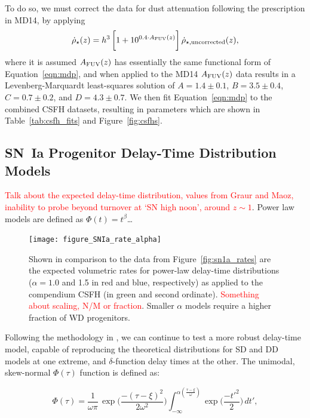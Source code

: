 \documentclass[apj]{aastex62}
\begin{document}
To do so, we must correct the \cite{Driver:2018nr} data for dust attenuation following the prescription in MD14, by applying 
\begin{equation}
	\dot{\rho}_{\star}(z) =h^3\,\biggl[1+10^{0.4\cdot A_{\rm FUV}(z)}\biggr]\, \dot{\rho}_{\star, {\rm uncorrected}}(z),
\end{equation}
where it is assumed $A_{\rm FUV}(z)$ has essentially the same functional form of Equation~\ref{eqn:mdp}, and when applied to the MD14 $A_{\rm FUV}(z)$ data results in a Levenberg-Marquardt least-squares solution of $A=1.4\pm0.1$, $B=3.5\pm0.4$, $C=0.7\pm0.2$, and $D=4.3\pm0.7$. We then fit Equation~\ref{eqn:mdp} to the combined CSFH datasets,    resulting in parameters which are shown in Table~\ref{tab:csfh_fits} and Figure~\ref{fig:csfhs}. 



\subsection{SN~Ia Progenitor Delay-Time Distribution Models}
\noindent \textcolor{red}{Talk about the expected delay-time distribution, values from Graur and Maoz, inability to probe beyond turnover at `SN high noon', around $z\sim1$}. Power law models are defined as $\Phi(t)=t^{\beta}$\ldots

\begin{figure}[b]
   \centering
   \texttt{[image: figure\_SNIa\_rate\_alpha]}
   \caption{\footnotesize Shown in comparison to the data from Figure~\ref{fig:sn1a_rates} are the expected volumetric rates for power-law delay-time distributions ($\alpha = 1.0$ and 1.5 in red and blue, respectively) as applied to the compendium CSFH (in green and second ordinate). \textcolor{red}{Something about scaling, N/M or fraction}. Smaller $\alpha$ models require a higher fraction of WD progenitors.}
   \label{fig:sn1a_rates2}
\end{figure}

Following the methodology in \cite{Strolger:2010}, we can continue to test a more robust delay-time model, capable of reproducing the theoretical distributions for SD and DD models at one extreme, and $\delta$-function delay times at the other. The unimodal, skew-normal $\Phi(\tau)$ function is defined as:

\begin{equation}
	\Phi(\tau)=\frac{1}{\omega\pi}\,\exp\biggl(\frac{-(\tau-\xi)^2}{2\omega^2}\biggr)\int_{-\infty}^{\alpha (\frac{\tau-\xi}{\omega})} \exp\biggl(\frac{-t'^2}{2}\biggr)\,dt',
\label{eqn:model}
\end{equation}
\end{document}
